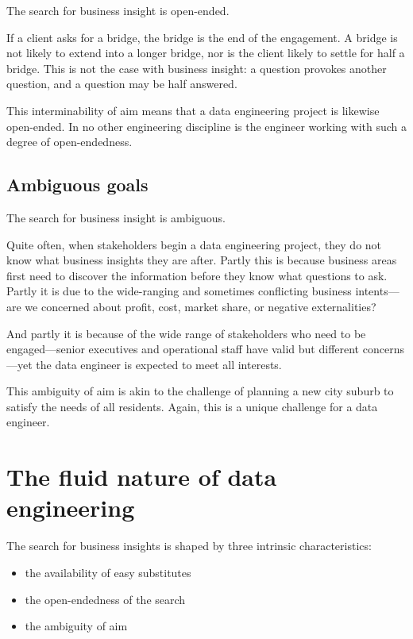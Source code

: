 \documentclass[10pt,openany,10pt]{book}
\providecommand{\tightlist}{%
  \setlength{\itemsep}{0pt}\setlength{\parskip}{0pt}}
\begin{document}
The search for business insight is open-ended.

If a client asks for a bridge, the bridge is the end of the engagement.
A bridge is not likely to extend into a longer bridge, nor is the client
likely to settle for half a bridge. This is not the case with business
insight: a question provokes another question, and a question may be
half answered.

This interminability of aim means that a data engineering project is
likewise open-ended. In no other engineering discipline is the engineer
working with such a degree of open-endedness.

\subsection{Ambiguous goals}\label{ambiguous-goals}

The search for business insight is ambiguous.

Quite often, when stakeholders begin a data engineering project, they do
not know what business insights they are after. Partly this is because
business areas first need to discover the information before they know
what questions to ask. Partly it is due to the wide-ranging and
sometimes conflicting business intents---are we concerned about profit,
cost, market share, or negative externalities?

And partly it is because of the wide range of stakeholders who need to
be engaged---senior executives and operational staff have valid but
different concerns---yet the data engineer is expected to meet all
interests.

This ambiguity of aim is akin to the challenge of planning a new city
suburb to satisfy the needs of all residents. Again, this is a unique
challenge for a data engineer.

\section{The fluid nature of data
engineering}\label{the-fluid-nature-of-data-engineering}

The search for business insights is shaped by three intrinsic
characteristics:

\begin{itemize}
\tightlist
\item
  the availability of easy substitutes
\item
  the open-endedness of the search
\item
  the ambiguity of aim
\end{itemize}
\end{document}
